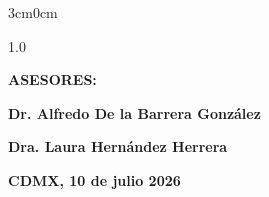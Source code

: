 \begin{titlepage}
\begin{adjustwidth}{3cm}{0cm}
\begin{spacing}{1.0}
    \vspace{0.5cm}
    {\normalsize \bfseries \MakeUppercase{Asesores:} \par}
    \vspace{0.1cm}
    {\normalsize \bfseries Dr. Alfredo De la Barrera González \par}
    \vspace{0.3cm}
    {\normalsize \bfseries Dra. Laura Hernández Herrera \par}
    \vspace{0.3cm} 
    \vfill
    {\normalsize \bfseries \raggedleft CDMX, 10 de julio 2026\par}
    \end{spacing}
\end{adjustwidth}
\end{titlepage}